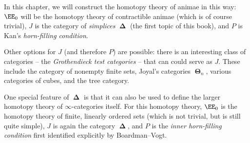 In this chapter, we will construct the homotopy theory of animae in this way:
$\EE_0$ will be the homotopy theory of contractible animae (which is of course trivial),
$J$ is the category of \emph{simplices} $\mbfDelta$ (the first topic of this book),
and $P$ is Kan's \emph{horn-filling condition}.

Other options for $J$ (and therefore $P$) are possible:
there is an interesting class of categories -- the \emph{Grothendieck test categories} -- that can could serve as $J$.
These include the category of nonempty finite sets, Joyal's categories $\mbfTheta_n$, various categories of cubes, and the tree category.

One special feature of $\mbfDelta$ is that it can also be used to define the larger homotopy theory of $\infty$-categories itself.
For this homotopy theory, $\EE_0$ is the homotopy theory of finite, linearly ordered sets (which is not trivial, but is still quite simple),
$J$ is again the category $\mbfDelta$,
and $P$ is the \emph{inner horn-filling condition} first identified explicitly by Boardman--Vogt.



